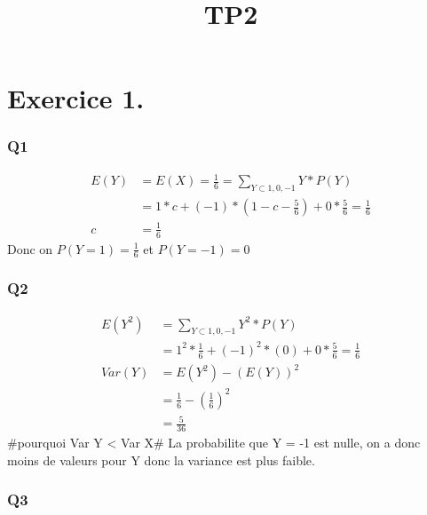 \documentclass[]{article}
\title{TP2}
\author{}
\date{}
\begin{document}
\maketitle

\section{Exercice 1.}\label{exercice-1.}

\subsubsection{Q1}\label{q1}

\[
\begin{aligned}
E(Y)&=E(X)=\frac{1}{6}=\sum_{Y\subset{1,0,-1}}Y*P(Y)\\
&=1*c+(-1)*(1-c-\frac{5}{6})+0*\frac{5}{6}=\frac{1}{6}\\
c&=\frac{1}{6}
\end{aligned}
\] Donc on \(P(Y=1)=\frac{1}{6}\) et \(P(Y=-1)=0\)

\subsubsection{Q2}\label{q2}

\[
\begin{aligned}
E(Y^2)&=\sum_{Y\subset{1,0,-1}}Y^2*P(Y)\\
&=1^2*\frac{1}{6}+(-1)^2*(0)+0*\frac{5}{6}=\frac{1}{6}\\
Var(Y)&=E(Y^2)-(E(Y))^2\\
&=\frac{1}{6}-(\frac{1}{6})^2\\
&=\frac{5}{36}
\end{aligned}
\] \#pourquoi Var Y \textless{} Var X\# La probabilite que Y = -1 est
nulle, on a donc moins de valeurs pour Y donc la variance est plus
faible.

\subsubsection{Q3}\label{q3}
\end{document}
